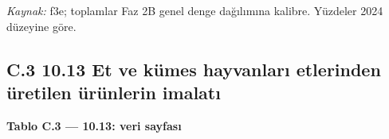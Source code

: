 \endgroup

\emph{Kaynak:} \etiketT{} f3e; toplamlar Faz 2B genel denge dağılımına kalibre. Yüzdeler 2024 düzeyine göre.

\hypertarget{nace_kartlar_10-12-c3-1013-et-ve-kuxfcmes-hayvanlarux131-etlerinden-uxfcretilen-uxfcruxfcnlerin-imalatux131}{%
\subsection{C.3 10.13 Et ve kümes hayvanları etlerinden üretilen ürünlerin imalatı}\label{nace_kartlar_10-12-c3-1013-et-ve-kuxfcmes-hayvanlarux131-etlerinden-uxfcretilen-uxfcruxfcnlerin-imalatux131}}


\textbf{Tablo C.3 --- 10.13: veri sayfası}

\nopagebreak[4]

\begingroup\gbtablo\small

